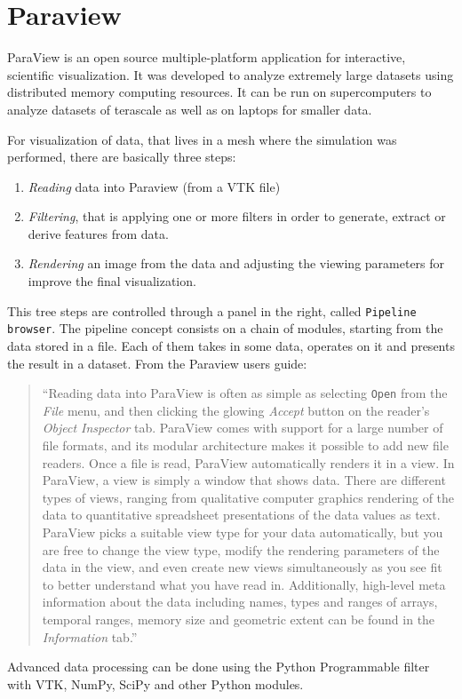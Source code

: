 \documentclass[12pt]{article}
\begin{document}
\section{Paraview}
\label{sec:brief-intro-paraview}

ParaView is an open source multiple-platform application for
interactive, scientific visualization. It was developed to analyze
extremely large datasets using distributed memory computing
resources. It can be run on supercomputers to analyze datasets of
terascale as well as on laptops for smaller data.

For visualization of data, that lives in a mesh where the simulation
was performed, there are basically three steps:
\begin{enumerate}
\item \textit{Reading} data into Paraview (from a VTK file)
\item \textit{Filtering}, that is applying one or more filters in order to
  generate, extract or derive features from data.
\item \textit{Rendering} an image from the data and adjusting the
  viewing parameters for improve the final visualization.
\end{enumerate}

This tree steps are controlled through a panel in the right, called
\texttt{Pipeline browser}. The pipeline concept consists on a chain of
modules, starting from the data stored in a file. Each
of them takes in some data, operates on it and presents the result in
a dataset.
From the Paraview users guide:
\begin{quote}\small
  ``Reading data into ParaView is often as simple as selecting
  \texttt{Open} from the \textit{File} menu, and then clicking the
  glowing \textit{Accept} button on the reader's \textit{Object
    Inspector} tab. ParaView comes with support for a large number of
  file formats, and its modular architecture makes it possible to add
  new file readers.  Once a file is read, ParaView automatically
  renders it in a view. In ParaView, a view is simply a window that
  shows data. There are different types of views, ranging from
  qualitative computer graphics rendering of the data to quantitative
  spreadsheet presentations of the data values as text. ParaView picks
  a suitable view type for your data automatically, but you are free
  to change the view type, modify the rendering parameters of the data
  in the view, and even create new views simultaneously as you see fit
  to better understand what you have read in. Additionally, high-level
  meta information about the data including names, types and ranges of
  arrays, temporal ranges, memory size and geometric extent can be
  found in the \textit{Information} tab.''
\end{quote}
Advanced data processing can be done using the Python Programmable
filter with VTK, NumPy, SciPy and other Python modules.
\end{document}
